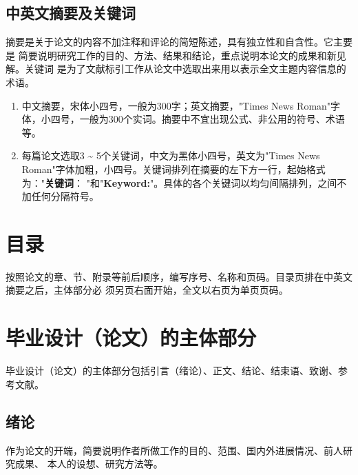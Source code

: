 \subsection{中英文摘要及关键词}
摘要是关于论文的内容不加注释和评论的简短陈述，具有独立性和自含性。它主要是
简要说明研究工作的目的、方法、结果和结论，重点说明本论文的成果和新见解。关键词
是为了文献标引工作从论文中选取出来用以表示全文主题内容信息的术语。
\begin{enumerate}
  \item 中文摘要，宋体小四号，一般为300字；英文摘要，"Times News Roman"字
体，小四号，一般为300个实词。摘要中不宜出现公式、非公用的符号、术语等。
  \item 每篇论文选取3 \~{} 5个关键词，中文为黑体小四号，英文为"Times News Roman"字体加粗，小四号。关键词排列在摘要的左下方一行，起始格式为："\textbf{关键词}：
      "和"\textbf{Keyword:}"。具体的各个关键词以均匀间隔排列，之间不加任何分隔符号。
\end{enumerate}

\section{目录}
按照论文的章、节、附录等前后顺序，编写序号、名称和页码。目录页排在中英文摘要之后，主体部分必
须另页右面开始，全文以右页为单页页码。

\section{毕业设计（论文）的主体部分}
毕业设计（论文）的主体部分包括引言（绪论）、正文、结论、结束语、致谢、参考文献。
\subsection{绪论}
作为论文的开端，简要说明作者所做工作的目的、范围、国内外进展情况、前人研究成果、
本人的设想、研究方法等。
